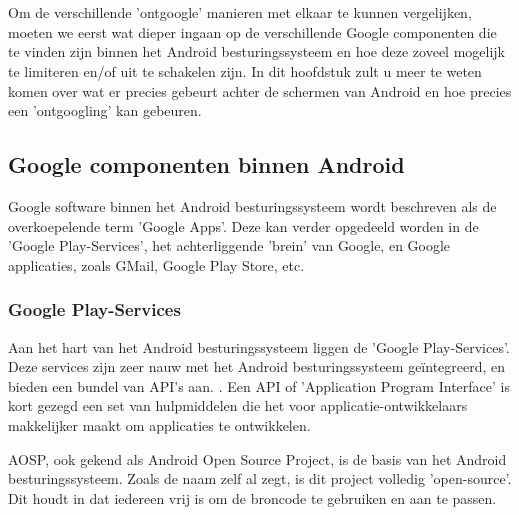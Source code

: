 \chapter{}
\label{ch:stand-van-zaken}



Om de verschillende 'ontgoogle' manieren met elkaar te kunnen vergelijken, moeten we eerst wat dieper ingaan op de verschillende Google componenten die te vinden zijn binnen het Android besturingssysteem en hoe deze zoveel mogelijk te limiteren en/of uit te schakelen zijn. In dit hoofdstuk zult u meer te weten komen over wat er precies gebeurt achter de schermen van Android en hoe precies een 'ontgoogling' kan gebeuren.

\section{Google componenten binnen Android}
Google software binnen het Android besturingssysteem wordt beschreven als de overkoepelende term 'Google Apps'. Deze kan verder opgedeeld worden in de 'Google Play-Services', het achterliggende 'brein' van Google, en Google applicaties, zoals GMail, Google Play Store, etc.

\subsection{Google Play-Services}

Aan het hart van het Android besturingssysteem liggen de 'Google Play-Services'. Deze services zijn zeer nauw met het Android besturingssysteem geïntegreerd, en bieden een bundel van API's aan. \autocite{marshall_google-play-services}. Een API of 'Application Program Interface' is kort gezegd een set van hulpmiddelen die het voor applicatie-ontwikkelaars makkelijker maakt om applicaties te ontwikkelen. \autocite{beal_api}

AOSP, ook gekend als Android Open Source Project, is de basis van het Android besturingssysteem. Zoals de naam zelf al zegt, is dit project volledig 'open-source'. Dit houdt in dat iedereen vrij is om de broncode te gebruiken en aan te passen. 

